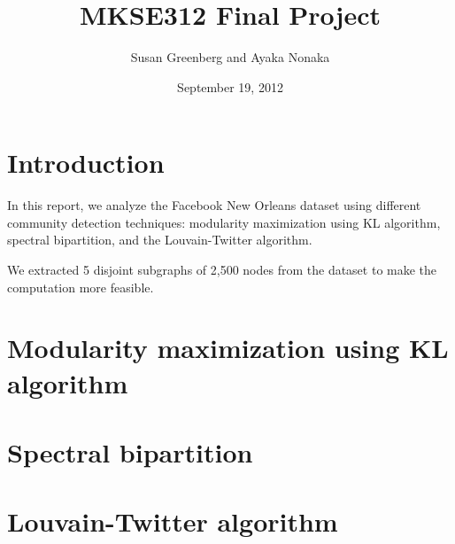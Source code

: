 \documentclass[11pt]{article}
\date{September 19, 2012}
\title{
MKSE312 Final Project
}
\author{
Susan Greenberg and Ayaka Nonaka
}
\begin{document}
\maketitle

\section{Introduction}
In this report, we analyze the Facebook New Orleans dataset using different community detection techniques: modularity maximization using KL algorithm, spectral bipartition, and the Louvain-Twitter algorithm.

We extracted 5 disjoint subgraphs of 2,500 nodes from the dataset to make the computation more feasible.

\section{Modularity maximization using KL algorithm}

\section{Spectral bipartition}

\section{Louvain-Twitter algorithm}

     
\end{document}

